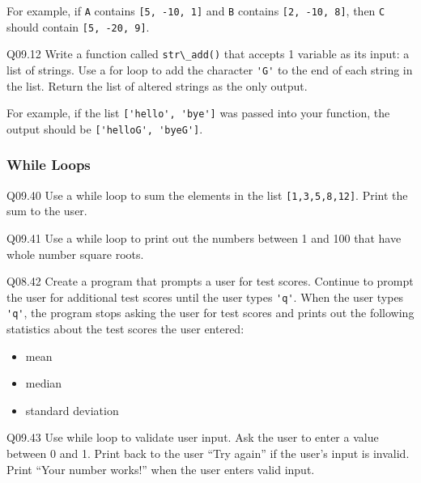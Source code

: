 \documentclass{book}
\newenvironment{problems}{}{}  %
\providecommand{\tightlist}{%
      \setlength{\itemsep}{0pt}\setlength{\parskip}{0pt}}
\newcommand{\passthrough}[1]{#1}
\begin{document}
\begin{problems}
For example, if \passthrough{\lstinline!A!} contains
\passthrough{\lstinline![5, -10, 1]!} and \passthrough{\lstinline!B!}
contains \passthrough{\lstinline![2, -10, 8]!}, then
\passthrough{\lstinline!C!} should contain
\passthrough{\lstinline![5, -20, 9]!}.

Q09.12 Write a function called \passthrough{\lstinline!str\_add()!} that
accepts 1 variable as its input: a list of strings. Use a for loop to
add the character \passthrough{\lstinline!'G'!} to the end of each
string in the list. Return the list of altered strings as the only
output.

For example, if the list \passthrough{\lstinline!['hello', 'bye']!} was
passed into your function, the output should be
\passthrough{\lstinline!['helloG', 'byeG']!}.
        \end{problems}

    




    
        \hypertarget{while-loops}{%
\subsubsection{While Loops}\label{while-loops}}
    




    
        Q09.40 Use a while loop to sum the elements in the list
\passthrough{\lstinline![1,3,5,8,12]!}. Print the sum to the user.

Q09.41 Use a while loop to print out the numbers between 1 and 100 that
have whole number square roots.

Q08.42 Create a program that prompts a user for test scores. Continue to
prompt the user for additional test scores until the user types
\passthrough{\lstinline!'q'!}. When the user types
\passthrough{\lstinline!'q'!}, the program stops asking the user for
test scores and prints out the following statistics about the test
scores the user entered:

\begin{itemize}
\tightlist
\item
  mean
\item
  median
\item
  standard deviation
\end{itemize}

Q09.43 Use while loop to validate user input. Ask the user to enter a
value between 0 and 1. Print back to the user ``Try again'' if the
user's input is invalid. Print ``Your number works!'' when the user
enters valid input.
\end{document}
